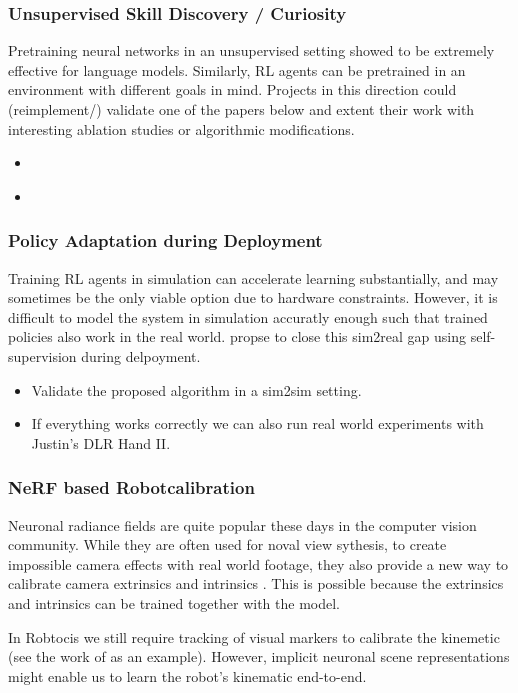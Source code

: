 \documentclass[a4paper]{article}
\begin{document}
\subsubsection{Unsupervised Skill Discovery / Curiosity}
Pretraining neural networks in an unsupervised setting showed to be extremely effective for language models. Similarly, RL agents can be pretrained in an environment with different goals in mind. Projects in this direction could (reimplement/) validate one of the papers below and extent their work with interesting ablation studies or algorithmic modifications.
\begin{itemize}
  \item \cite{Plan2Explore2020}
  \item \cite{DADS2020}
\end{itemize}

\subsubsection{Policy Adaptation during Deployment}
Training RL agents in simulation can accelerate learning substantially, and may sometimes be the only viable option due to hardware constraints. However, it is difficult to model the system in simulation accuratly enough such that trained policies also work in the real world. \cite{Hansen2021} propse to close this sim2real gap using self-supervision during delpoyment.
\begin{itemize}
  \item Validate the proposed algorithm in a sim2sim setting.
  \item If everything works correctly we can also run real world experiments with Justin's DLR Hand II.
\end{itemize}

\subsubsection{NeRF based Robotcalibration}
Neuronal radiance fields are quite popular these days in the computer vision community. While they are often used for noval view sythesis, to create impossible camera effects with real world footage, they also provide a new way to calibrate camera extrinsics and intrinsics \cite{lin2021barf, Sucar:etal:ICCV2021, wang2021nerfmm, SCNeRF2021}.
This is possible because the extrinsics and intrinsics can be trained together with the model.

In Robtocis we still require tracking of visual markers to calibrate the kinemetic (see the work of \cite{Birbach2014} as an example). However, implicit neuronal scene representations might enable us to learn the robot's kinematic end-to-end.
\end{document}

